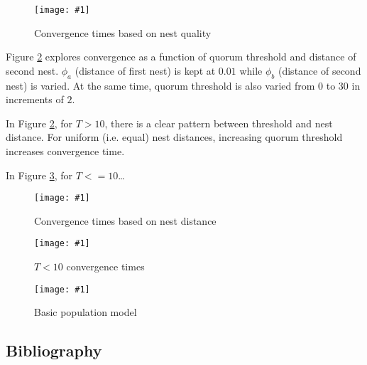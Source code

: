 \documentclass[letterpaper]{article}
\newcommand{\plot}[3]{
    \begin{figure}[h]
        \texttt{[image: \#1]}
        \caption{#2}
        \label{fig:#1}
    \end{figure}
}
\begin{document}
\plot{convergence_times}{Convergence times based on nest quality}{0.6}

Figure \ref{fig:distance_convergence_times} explores convergence as a function of quorum threshold and distance of second nest. 
$\phi_a$ (distance of first nest) is kept at $0.01$ while $\phi_b$ (distance of second nest) is varied.
At the same time, quorum threshold is also varied from $0$ to $30$ in increments of $2$.

In Figure \ref{fig:distance_convergence_times}, for $T > 10$, there is a clear pattern between threshold and nest distance. 
For uniform (i.e. equal) nest distances, increasing quorum threshold increases convergence time.

In Figure \ref{fig:distance_convergence_times_low_T}, for $T <= 10$\dots

\plot{distance_convergence_times}{Convergence times based on nest distance}{0.6}

\plot{distance_convergence_times_low_T}{$T < 10$ convergence times}{0.6}

\plot{agent_based_population_model}{Basic population model}{0.6}



\subsection{Bibliography}
  

\footnotesize


\end{document}
